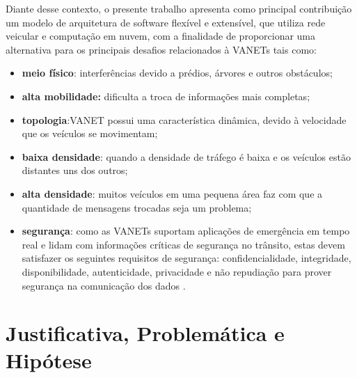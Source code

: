 \documentclass[
	12pt,				%
	oneside,			%
	a4paper,			%
	english,			%
	brazil				%
	]{abntex2ppgsi}
\begin{document}
Diante desse contexto, o presente trabalho apresenta como principal contribuição um modelo de arquitetura de software flexível e extensível, que utiliza rede veicular  e  computação em nuvem, com a finalidade de proporcionar uma alternativa para os principais desafios relacionados à VANETs tais como: 

\begin{itemize}
	\item{\textbf{meio físico}: interferências devido a prédios,  árvores e outros obstáculos;}
	\item{\textbf{alta mobilidade:} dificulta a troca de informações mais completas; }
	\item{\textbf{topologia}:VANET possui uma característica dinâmica, devido à velocidade que os veículos se movimentam;}	
	\item{\textbf{baixa densidade}: quando a densidade de tráfego é baixa e os veículos estão distantes uns dos outros;}
	\item{\textbf{alta densidade}: muitos veículos em uma pequena área faz com que a quantidade de mensagens trocadas seja um problema;}
	\item{\textbf{segurança}: como as VANETs suportam aplicações de emergência em tempo real e lidam com informações	críticas de segurança no trânsito, estas devem satisfazer os seguintes requisitos de segurança: confidencialidade, integridade, disponibilidade, autenticidade, privacidade e não repudiação para prover segurança na comunicação dos dados \cite{samara2010security} \cite{matos2013analise}.}
\end{itemize} 

%


\section{Justificativa, Problemática e Hipótese}
\end{document}
